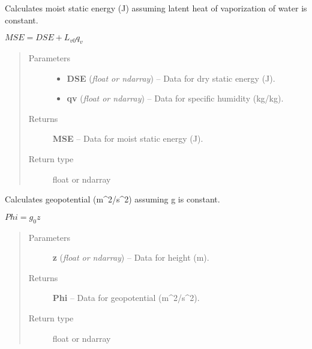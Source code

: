 \documentclass[letterpaper,10pt,english]{sphinxmanual}
\begin{document}
\begin{fulllineitems}
\label{atmos:atmos.equations.MSE_from_DSE_qv}
Calculates moist static energy (J) assuming latent heat of vaporization of water
is constant.

\(MSE = DSE + L_{v0} q_v\)
\begin{quote}\begin{description}
\item[{Parameters}] \leavevmode\begin{itemize}
\item {} 
\textbf{DSE} (\emph{float or ndarray}) -- Data for dry static energy (J).

\item {} 
\textbf{qv} (\emph{float or ndarray}) -- Data for specific humidity (kg/kg).

\end{itemize}

\item[{Returns}] \leavevmode
\textbf{MSE} --
Data for moist static energy (J).

\item[{Return type}] \leavevmode
float or ndarray

\end{description}\end{quote}

\end{fulllineitems}


\begin{fulllineitems}
\label{atmos:atmos.equations.Phi_from_z}
Calculates geopotential (m\textasciicircum{}2/s\textasciicircum{}2) assuming g is constant.

\(Phi = g_0 z\)
\begin{quote}\begin{description}
\item[{Parameters}] \leavevmode
\textbf{z} (\emph{float or ndarray}) -- Data for height (m).

\item[{Returns}] \leavevmode
\textbf{Phi} --
Data for geopotential (m\textasciicircum{}2/s\textasciicircum{}2).

\item[{Return type}] \leavevmode
float or ndarray

\end{description}\end{quote}

\end{fulllineitems}
\end{document}
